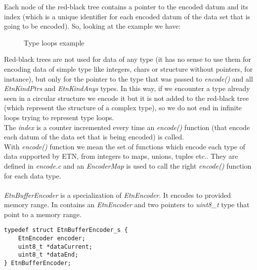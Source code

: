 Each node of the red-black tree contains a pointer to the encoded datum and its index (which is a unique identifier for each encoded datum of the data set that is going to be encoded). So, looking at the example we have:
\begin{figure}[H]
\centering
{}

\caption{Type loops example}
\end{figure}
Red-black trees are not used for data of any type (it has no sense to use them for encoding data of simple type like integers, chars or structure without pointers, for instance), but only for the pointer to the type that was passed to \emph{encode()} and all \emph{EtnKindPtrs} and \emph{EtnKindAnys} types. In this way, if we encounter a type already seen in a circular structure we encode it but it is not added to the red-black tree (which represent the structure of a complex type), so we do not end in infinite loops trying to represent type loops. \\
The \emph{index} is a counter incremented every time an \emph{encode()} function (that encode each datum of the data set that is being encoded) is called. \\
With \emph{encode()} function we mean the set of functions which encode each type of data supported by ETN, from integers to maps, unions, tuples etc.. They are defined in \emph{encode.c} and an \emph{EncoderMap} is used to call the right \emph{encode()} function for each data type.\\\\
\emph{EtnBufferEncoder} is a specialization of \emph{EtnEncoder}. It encodes to provided memory range. In contains an \emph{EtnEncoder} and two pointers to \emph{uint8\_t} type that point to a memory range.
\begin{lstlisting}
typedef struct EtnBufferEncoder_s {
	EtnEncoder encoder;
	uint8_t *dataCurrent;
	uint8_t *dataEnd;
} EtnBufferEncoder;
\end{lstlisting}
